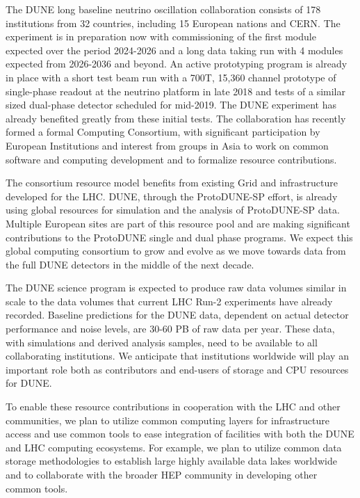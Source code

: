The DUNE long baseline neutrino oscillation collaboration consists of 178 institutions from 32 countries, including 15 European nations and CERN. The experiment is in preparation now with commissioning of the first module expected over the period 2024-2026 and a long data taking run with 4 modules expected from 2026-2036 and beyond.  An active prototyping program is already in place with a short test beam run with a 700T, 15,360 channel prototype of single-phase readout at the neutrino platform  in late 2018 and tests of a similar sized dual-phase detector scheduled for mid-2019.   The DUNE experiment has already  benefited greatly from these initial tests.  The collaboration has recently formed a formal Computing Consortium, with significant participation by European Institutions and interest from groups in Asia to work on common software and computing development and to formalize resource contributions.

The consortium resource model benefits from existing Grid and  infrastructure developed for the LHC.  DUNE, through  the ProtoDUNE-SP effort, is already using global resources for simulation and the analysis of ProtoDUNE-SP data.  Multiple European sites are part of this resource pool and are making significant contributions to the ProtoDUNE single and dual phase programs.  We expect this global computing consortium to grow and evolve as we move towards data from the full DUNE detectors in the middle of the next decade.

The DUNE science program is expected to produce raw data volumes similar in scale to the data volumes that current LHC Run-2 experiments have already recorded.  Baseline predictions for the DUNE data, dependent on actual detector performance and noise levels, are 30-60 PB of raw data per year.  These data, with simulations and derived analysis samples, need to be available to all collaborating institutions.  We anticipate that institutions worldwide will play an important role both as contributors and end-users of storage and CPU resources for DUNE.

To enable these resource contributions in cooperation with the LHC and other communities, we plan to utilize common computing layers for infrastructure access and use common tools to ease integration of facilities with both the DUNE and LHC computing ecosystems.  For example, we plan to utilize common data storage methodologies to establish large highly available data lakes worldwide  and to collaborate with the broader HEP community in developing other common tools.

